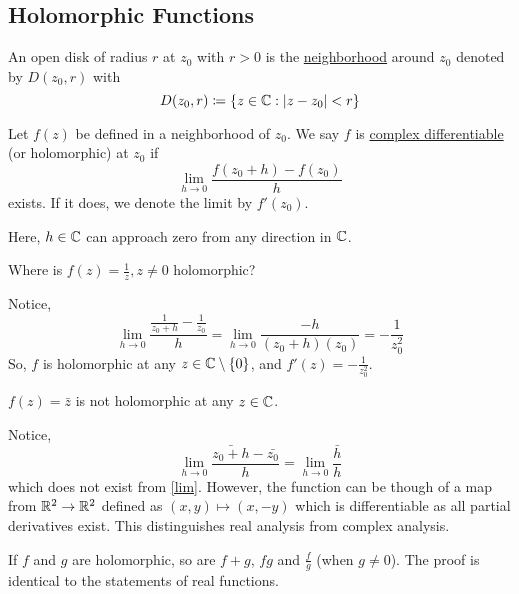 \documentclass[11pt]{article}
\begin{document}
\subsection{Holomorphic Functions}
\begin{definition}
	An open disk of radius $r$ at $z_0$ with $r>0$ is the
	\underline{neighborhood} around $z_0$ denoted by $D(z_0, r)$ with
	\begin{equation*}
		D(z_0, r) \coloneqq \{z\in\mathbb{C}:|z-z_0|<r\}
	\end{equation*}
\end{definition}
\begin{definition}
	Let $f(z)$ be defined in a neighborhood of $z_0$. We say $f$ is
	\underline{complex differentiable} (or holomorphic) at $z_0$ if
	\begin{equation*}
		\lim_{h\to 0} \frac{f(z_0+h) - f(z_0)}{h}
	\end{equation*}
	exists. If it does, we denote the limit by $f'(z_0)$.
\end{definition}
\begin{remark}
	Here, $h\in\mathbb{C}$ can approach zero from any direction in $\mathbb{C}$.
\end{remark}
\begin{example}
	Where is $f(z) = \frac{1}{z}, z \neq 0$ holomorphic?
\end{example}
Notice,
\begin{equation*}
	\lim_{h\to 0} \frac{\frac{1}{z_0+h} - \frac{1}{z_0}}{h}
	= \lim_{h\to 0} \frac{-h}{(z_0+h)(z_0)}
	= -\frac{1}{z_0^2}
\end{equation*}
So, $f$ is holomorphic at any $z \in \mathbb{C} \setminus \{0\}$, and $f'(z) =
-\frac{1}{z_0^2}$.
\begin{example}
	$f(z) = \bar z$ is not holomorphic at any $z \in \mathbb{C}$.
\end{example}
Notice,
\begin{equation*}
	\lim_{h\to 0} \frac{\bar{z_0 + h} - \bar{z_0}}{h}
	= \lim_{h \to 0} \frac{\bar h}{h}
\end{equation*}
which does not exist from \cref{lim}. However, the function can be though of a
map from $\mathbb{R}^2 \to \mathbb{R}^2$ defined as $(x,y) \mapsto (x,-y)$ which is
differentiable as all partial derivatives exist. This distinguishes real
analysis from complex analysis.
\begin{remark}
	If $f$ and $g$ are holomorphic, so are $f+g$, $fg$ and $\frac{f}{g}$ (when
	$g\neq 0$). The proof is identical to the statements of real functions.
\end{remark}
\sectionline
\end{document}
